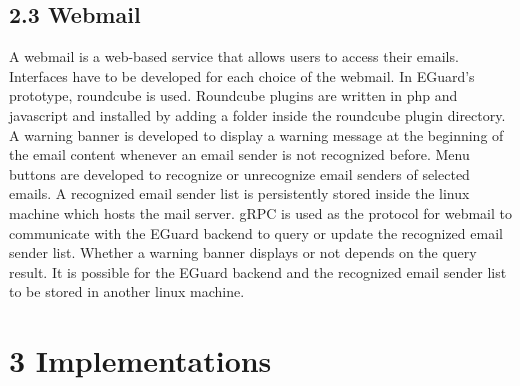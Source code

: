 \documentclass[11pt]{article}
\begin{document}
\subsection*{2.3 \hspace{10pt} Webmail}
A webmail is a web-based service that allows users to access their emails. Interfaces have to be developed for each choice of the webmail. In EGuard's prototype, roundcube is used. Roundcube plugins are written in php and javascript and installed by adding a folder inside the roundcube plugin directory. A warning banner is developed to display a warning message at the beginning of the email content whenever an email sender is not recognized before. Menu buttons are developed to recognize or unrecognize email senders of selected emails. A recognized email sender list is persistently stored inside the linux machine which hosts the mail server. gRPC is used as the protocol for webmail to communicate with the EGuard backend to query or update the recognized email sender list. Whether a warning banner displays or not depends on the query result. It is possible for the EGuard backend and the recognized email sender list to be stored in another linux machine.

\section*{\large{3 \hspace{10pt} Implementations}}
\end{document}
